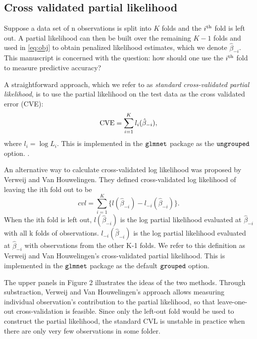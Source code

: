 \subsection{Cross validated partial likelihood} 
\label{Sec:cox-cv-existing}

Suppose a data set of n observations is split into $K$ folds and the $i^\textrm{th}$ fold is left out.  A partial likelihood can then be built over the remaining $K-1$ folds and used in \eqref{eq:obj} to obtain penalized likelihood estimates, which we denote $\hat{\beta}_{-i}$.
This manuscript is concerned with the question: how should one use the $i^\textrm{th}$ fold to measure predictive accuracy?

A straightforward approach, which we refer to as \emph{standard cross-validated partial likelihood}, is to use the partial likelihood on the test data as the cross validated error (CVE):
\begin{equation}
  \textrm{CVE} = \sum_{i=1}^{K} l_{i}(\hat{\beta}_{-i}),
\end{equation}
where $l_i = \log L_i$.
This is implemented in the $\tt{glmnet}$ package as the $\tt{ungrouped}$ option.
.

An alternative way to calculate cross-validated log likelihood was proposed by Verweij and Van Houwelingen. They defined cross-validated log likelihood of leaving the ith fold out to be \begin{equation}cvl = \sum_{i=1}^{K} \{l(\hat{\beta}_{-i}) - l_{-i}(\hat{\beta}_{-i})\}. \end{equation} When the ith fold is left out, $l(\hat{\beta}_{-i})$ is the log partial likelihood evaluated at $\hat{\beta}_{-i}$ with all k folds of observations. $l_{-i}(\hat{\beta}_{-i})$ is the log partial likelihood evaluated at $\hat{\beta}_{-i}$ with observations from the other K-1 folds. We refer to this definition as Verweij and Van Houwelingen's cross-validated partial likelihood. This is implemented in the $\tt{glmnet}$ package as the default $\tt{grouped}$ option.

\par The upper panels in Figure 2 illustrates the ideas of the two methods. Through substraction, Verweij and Van Houwelingen's approach allows measuring individual observation's contribution to the partial likelihood, so that leave-one-out cross-validation is feasible. Since only the left-out fold would be used to construct the partial likelihood, the standard CVL is unstable in practice when there are only very few observations in some folder. 

